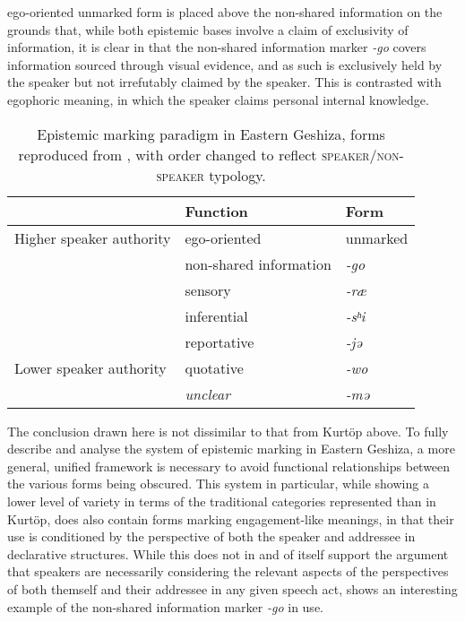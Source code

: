 ego-oriented unmarked form is placed above the non-shared information on the grounds that, while both epistemic bases involve a claim of exclusivity of information, it is clear in  that the non-shared information marker \textit{-go} covers information sourced through visual evidence, and as such is exclusively held by the speaker but not irrefutably claimed by the speaker. This is contrasted with egophoric meaning, in which the speaker claims personal internal knowledge.

\begin{table}
    \caption{Epistemic marking paradigm in Eastern Geshiza, forms reproduced from \cite[584]{Honkasalo2019}, with order changed to reflect \textsc{speaker/non-speaker} typology.}\label{t:Discussion:EasternGeshiza}
    \centering
    \begin{tabular}{lll}
        \hline
                                 & Function               & Form          \\ \hline
        Higher speaker authority & ego-oriented           & unmarked      \\
                                 & non-shared information & \textit{-go}  \\
                                 & sensory                & \textit{-ræ}  \\
                                 & inferential            & \textit{-sʰi} \\
                                 & reportative            & \textit{-jə}  \\
        Lower speaker authority  & quotative              & \textit{-wo}  \\ \hline
                                 & \textit{unclear}       & \textit{-mə}  \\ \hline
    \end{tabular}
\end{table}

The conclusion drawn here is not dissimilar to that from Kurtöp above. To fully describe and analyse the system of epistemic marking in Eastern Geshiza, a more general, unified framework is necessary to avoid functional relationships between the various forms being obscured. This system in particular, while showing a lower level of variety in terms of the traditional categories represented than in Kurtöp, does also contain forms marking engagement-like meanings, in that their use is conditioned by the perspective of both the speaker and addressee in declarative structures. While this does not in and of itself support the argument that speakers are necessarily considering the relevant aspects of the perspectives of both themself and their addressee in any given speech act,  shows an interesting example of the non-shared information marker \textit{-go} in use.

